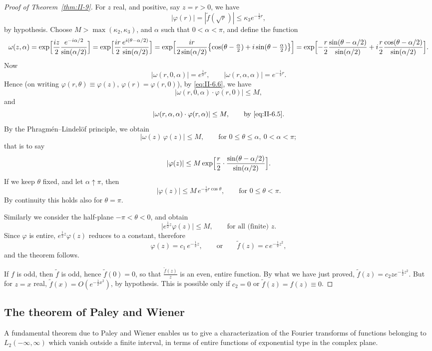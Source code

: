 \begin{proof}[Proof of Theorem~\ref{thm:II-9}]
For $z$ real, and positive, say $z=r>0$, we have
\begin{equation}\tag{6.6}\label{eq:II-6.6}
|\varphi(r)|=|\tilde f(\sqrt{r})|\le\kappa_{3}e^{-\frac{1}{2}r},
\end{equation}
by hypothesis. Choose $M>\max(\kappa_{2},\kappa_{3})$, and $\alpha$ such that $0<\alpha<\pi$, and define the function
\[
\omega(z,\alpha)=\exp\Bigl[\frac{iz}{2}\frac{e^{-i\alpha/2}}{\sin(\alpha/2)}\Bigr]
=\exp\Bigl[\frac{ir}{2}\frac{e^{i(\theta-\alpha/2)}}{\sin(\alpha/2)}\Bigr]
=\exp\Bigl[\frac{ir}{2\sin(\alpha/2)}\bigl\{\cos(\theta-\tfrac{\alpha}{2})+i\sin(\theta-\tfrac{\alpha}{2})\bigr\}\Bigr]
=\exp\Bigl[-\frac{r}{2}\frac{\sin(\theta-\alpha/2)}{\sin(\alpha/2)}+i\frac{r}{2}\frac{\cos(\theta-\alpha/2)}{\sin(\alpha/2)}\Bigr].
\]
Now
\[
|\omega(r,0,\alpha)|=e^{\frac{1}{2}r},\qquad |\omega(r,\alpha,\alpha)|=e^{-\frac{1}{2}r}.
\]
Hence (on writing $\varphi(r,\theta)\equiv\varphi(z)$, $\varphi(r)=\varphi(r,0)$), by \eqref{eq:II-6.6}, we have
\[
|\omega(r,0,\alpha)\cdot\varphi(r,0)|\le M,
\]
and
\[
|\omega(r,\alpha,\alpha)\cdot\varphi(r,\alpha)|\le M,\qquad\text{by \eqref{eq:II-6.5}}.
\]
By the Phragm\'en--Lindel\"of principle, we obtain
\[
|\omega(z)\,\varphi(z)|\le M,\qquad\text{for }0\le\theta\le\alpha,\ 0<\alpha<\pi;
\]
that is to say
\[
|\varphi(z)|\le M\exp\Bigl[\frac{r}{2}\cdot\frac{\sin(\theta-\alpha/2)}{\sin(\alpha/2)}\Bigr].
\]
If we keep $\theta$ fixed, and let $\alpha\uparrow\pi$, then
\[
|\varphi(z)|\le M\,e^{-\frac{1}{2}r\cos\theta},\qquad\text{for }0\le\theta<\pi.
\]
By continuity this holds also for $\theta=\pi$.

Similarly we consider the half-plane $-\pi<\theta<0$, and obtain
\[
\bigl|e^{\frac{1}{2}z}\varphi(z)\bigr|\le M,\qquad\text{for all (finite) }z.
\]
Since $\varphi$ is entire, $e^{\frac{1}{2}z}\varphi(z)$ reduces to a constant, therefore
\[
\varphi(z)=c_{1}\,e^{-\frac{1}{2}z},\qquad\text{or}\qquad \tilde f(z)=c\,e^{-\frac{1}{2}z^{2}},
\]
and the theorem follows.

If $f$ is odd, then $\tilde f$ is odd, hence $\tilde f(0)=0$, so that $\frac{\tilde f(z)}{z}$ is an even, entire function. By what we have just proved, $\tilde f(z)=c_{2}z e^{-\frac{1}{2}z^{2}}$. But for $z=x$ real, $\tilde f(x)=O(e^{-\frac{1}{2}x^{2}})$, by hypothesis. This is possible only if $c_{2}=0$ or $\tilde f(z)=f(z)\equiv 0$.
\end{proof}

\subsection*{The theorem of Paley and Wiener}
\noindent A fundamental theorem due to Paley and Wiener enables us to give a characterization of the Fourier transforms of functions belonging to $L_{2}(-\infty,\infty)$ which vanish outside a finite interval, in terms of entire functions of exponential type in the complex plane.

